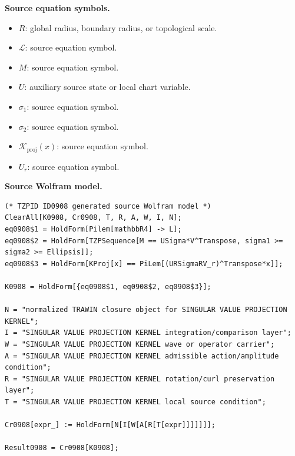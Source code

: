 \begin{minipage}[t]{0.49\linewidth}
\begingroup
\small
\raggedright
\textbf{Source equation symbols.}\par
\begin{itemize}[leftmargin=1.35em,itemsep=1pt,topsep=1pt,parsep=0pt]
    \item $R$: global radius, boundary radius, or topological scale.
    \item $\mathcal{L}$: source equation symbol.
    \item $M$: source equation symbol.
    \item $U$: auxiliary source state or local chart variable.
    \item $\sigma_1$: source equation symbol.
    \item $\sigma_2$: source equation symbol.
    \item $\mathcal{K}_{\mathrm{proj}}(x)$: source equation symbol.
    \item $U_r$: source equation symbol.
\end{itemize}
\endgroup
\end{minipage}\hfill
\begin{minipage}[t]{0.47\linewidth}
\begingroup
\scriptsize
\raggedright
\textbf{Source Wolfram model.}\par
\begin{Verbatim}[fontsize=\tiny,breaklines=true,breakanywhere=true]
(* TZPID ID0908 generated source Wolfram model *)
ClearAll[K0908, Cr0908, T, R, A, W, I, N];
eq0908$1 = HoldForm[Pilem[mathbbR4] -> L];
eq0908$2 = HoldForm[TZPSequence[M == USigma*V^Transpose, sigma1 >= sigma2 >= Ellipsis]];
eq0908$3 = HoldForm[KProj[x] == PiLem[(URSigmaRV_r)^Transpose*x]];

K0908 = HoldForm[{eq0908$1, eq0908$2, eq0908$3}];

N = "normalized TRAWIN closure object for SINGULAR VALUE PROJECTION KERNEL";
I = "SINGULAR VALUE PROJECTION KERNEL integration/comparison layer";
W = "SINGULAR VALUE PROJECTION KERNEL wave or operator carrier";
A = "SINGULAR VALUE PROJECTION KERNEL admissible action/amplitude condition";
R = "SINGULAR VALUE PROJECTION KERNEL rotation/curl preservation layer";
T = "SINGULAR VALUE PROJECTION KERNEL local source condition";

Cr0908[expr_] := HoldForm[N[I[W[A[R[T[expr]]]]]]];

Result0908 = Cr0908[K0908];
\end{Verbatim}
\endgroup
\end{minipage}

